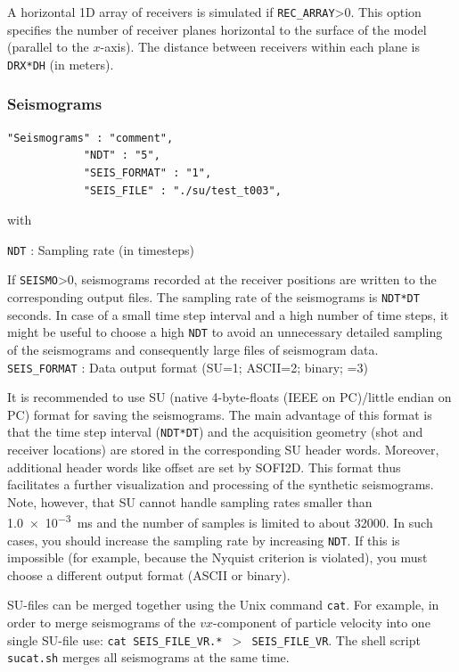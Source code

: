 A horizontal 1D array of receivers is simulated if \texttt{REC\_ARRAY}>0. This option specifies the number of receiver planes horizontal to the surface of the model (parallel to the $x$-axis). The distance between receivers within each plane is \texttt{DRX*DH} (in meters).

\subsubsection{Seismograms}
\label{seismograms}
\begin{verbatim}
"Seismograms" : "comment",
            "NDT" : "5",
            "SEIS_FORMAT" : "1",
            "SEIS_FILE" : "./su/test_t003",
\end{verbatim}

with

\texttt{NDT} : Sampling rate (in timesteps)

If \texttt{SEISMO}>0, seismograms recorded at the receiver positions are written to the corresponding output files. The sampling rate of the seismograms is \texttt{NDT*DT} seconds. In case of a small time step interval and a high number of time steps, it might be useful to choose a high \texttt{NDT} to avoid an unnecessary detailed sampling of the seismograms and consequently large files of seismogram data.\\

\texttt{SEIS\_FORMAT} : Data output format (SU=1; ASCII=2; binary; =3)

It is recommended to use SU (native 4-byte-floats (IEEE on PC)/little endian on PC) format for saving the seismograms. The main advantage of this format is that the time step interval (\texttt{NDT*DT}) and the acquisition geometry (shot and receiver locations) are stored in the corresponding SU header words. Moreover, additional header words like offset are set by SOFI2D. This format thus facilitates a further visualization and processing of the synthetic seismograms. Note, however, that SU cannot handle sampling rates smaller than \SI{1.0e-3}{ms} and the number of samples is limited to about \SI{32000}{}. In such cases, you should increase the sampling rate by increasing \texttt{NDT}. If this is impossible (for example, because the Nyquist criterion is violated), you must choose a different output format (ASCII or binary). 

SU-files can be merged together using the Unix command \texttt{cat}. For example, in order to merge seismograms of the $vx$-component of particle velocity into one single SU-file use: \texttt{cat SEIS\_FILE\_VR.* $>$ SEIS\_FILE\_VR}. The shell script \texttt{sucat.sh} merges all seismograms at the same time.\\

